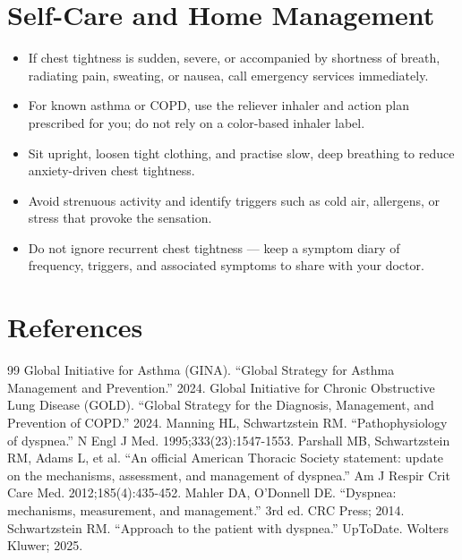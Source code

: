 \section*{Self-Care and Home Management}
\begin{itemize}
  \item If chest tightness is sudden, severe, or accompanied by shortness of breath, radiating pain, sweating, or nausea, call emergency services immediately.
   \item For known asthma or COPD, use the reliever inhaler and action plan prescribed for you; do not rely on a color-based inhaler label.
  \item Sit upright, loosen tight clothing, and practise slow, deep breathing to reduce anxiety-driven chest tightness.
  \item Avoid strenuous activity and identify triggers such as cold air, allergens, or stress that provoke the sensation.
  \item Do not ignore recurrent chest tightness — keep a symptom diary of frequency, triggers, and associated symptoms to share with your doctor.
\end{itemize}

\section*{References}
\begin{thebibliography}{99}
 Global Initiative for Asthma (GINA). ``Global Strategy for Asthma Management and Prevention.'' 2024.
 Global Initiative for Chronic Obstructive Lung Disease (GOLD). ``Global Strategy for the Diagnosis, Management, and Prevention of COPD.'' 2024.
 Manning HL, Schwartzstein RM. ``Pathophysiology of dyspnea.'' N Engl J Med. 1995;333(23):1547-1553.
 Parshall MB, Schwartzstein RM, Adams L, et al. ``An official American Thoracic Society statement: update on the mechanisms, assessment, and management of dyspnea.'' Am J Respir Crit Care Med. 2012;185(4):435-452.
 Mahler DA, O'Donnell DE. ``Dyspnea: mechanisms, measurement, and management.'' 3rd ed. CRC Press; 2014.
 Schwartzstein RM. ``Approach to the patient with dyspnea.'' UpToDate. Wolters Kluwer; 2025.
\end{thebibliography}
